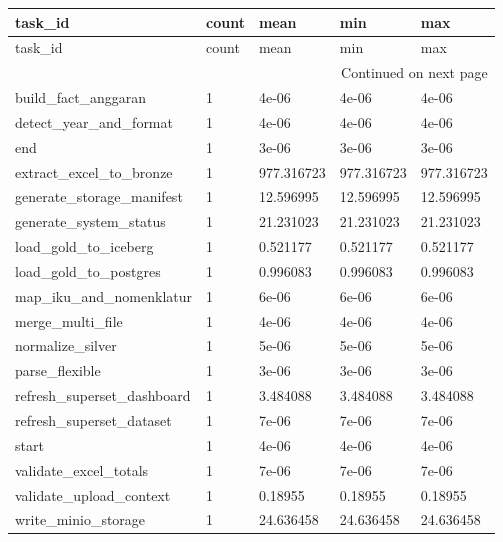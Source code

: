 \begingroup
\scriptsize
\begin{longtable}{lllll}
\toprule
task_id & count & mean & min & max \\
\midrule
\endfirsthead
\toprule
task_id & count & mean & min & max \\
\midrule
\endhead
\midrule
\multicolumn{5}{r}{Continued on next page} \\
\midrule
\endfoot
\bottomrule
\endlastfoot
build\_fact\_anggaran & 1 & 4e-06 & 4e-06 & 4e-06 \\
detect\_year\_and\_format & 1 & 4e-06 & 4e-06 & 4e-06 \\
end & 1 & 3e-06 & 3e-06 & 3e-06 \\
extract\_excel\_to\_bronze & 1 & 977.316723 & 977.316723 & 977.316723 \\
generate\_storage\_manifest & 1 & 12.596995 & 12.596995 & 12.596995 \\
generate\_system\_status & 1 & 21.231023 & 21.231023 & 21.231023 \\
load\_gold\_to\_iceberg & 1 & 0.521177 & 0.521177 & 0.521177 \\
load\_gold\_to\_postgres & 1 & 0.996083 & 0.996083 & 0.996083 \\
map\_iku\_and\_nomenklatur & 1 & 6e-06 & 6e-06 & 6e-06 \\
merge\_multi\_file & 1 & 4e-06 & 4e-06 & 4e-06 \\
normalize\_silver & 1 & 5e-06 & 5e-06 & 5e-06 \\
parse\_flexible & 1 & 3e-06 & 3e-06 & 3e-06 \\
refresh\_superset\_dashboard & 1 & 3.484088 & 3.484088 & 3.484088 \\
refresh\_superset\_dataset & 1 & 7e-06 & 7e-06 & 7e-06 \\
start & 1 & 4e-06 & 4e-06 & 4e-06 \\
validate\_excel\_totals & 1 & 7e-06 & 7e-06 & 7e-06 \\
validate\_upload\_context & 1 & 0.18955 & 0.18955 & 0.18955 \\
write\_minio\_storage & 1 & 24.636458 & 24.636458 & 24.636458 \\
\end{longtable}
\endgroup
